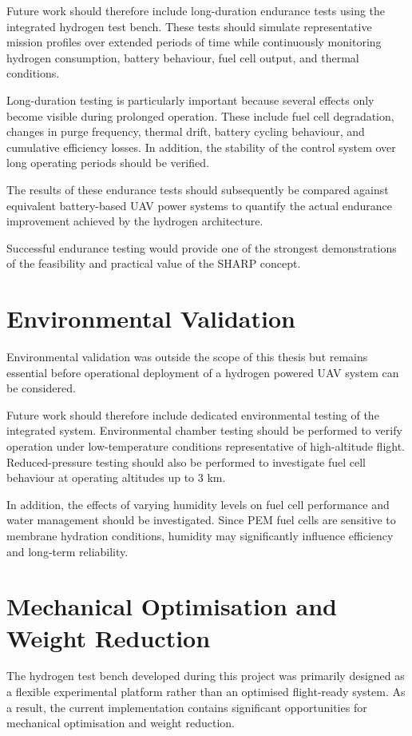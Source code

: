Future work should therefore include long-duration endurance tests using the integrated hydrogen test bench. These tests should simulate representative mission profiles over extended periods of time while continuously monitoring hydrogen consumption, battery behaviour, fuel cell output, and thermal conditions.

Long-duration testing is particularly important because several effects only become visible during prolonged operation. These include fuel cell degradation, changes in purge frequency, thermal drift, battery cycling behaviour, and cumulative efficiency losses. In addition, the stability of the control system over long operating periods should be verified.

The results of these endurance tests should subsequently be compared against equivalent battery-based UAV power systems to quantify the actual endurance improvement achieved by the hydrogen architecture.

Successful endurance testing would provide one of the strongest demonstrations of the feasibility and practical value of the SHARP concept.

\section{Environmental Validation}
Environmental validation was outside the scope of this thesis but remains essential before operational deployment of a hydrogen powered UAV system can be considered.

Future work should therefore include dedicated environmental testing of the integrated system. Environmental chamber testing should be performed to verify operation under low-temperature conditions representative of high-altitude flight. Reduced-pressure testing should also be performed to investigate fuel cell behaviour at operating altitudes up to 3 km.

In addition, the effects of varying humidity levels on fuel cell performance and water management should be investigated. Since PEM fuel cells are sensitive to membrane hydration conditions, humidity may significantly influence efficiency and long-term reliability.


\section{Mechanical Optimisation and Weight Reduction}
The hydrogen test bench developed during this project was primarily designed as a flexible experimental platform rather than an optimised flight-ready system. As a result, the current implementation contains significant opportunities for mechanical optimisation and weight reduction.

